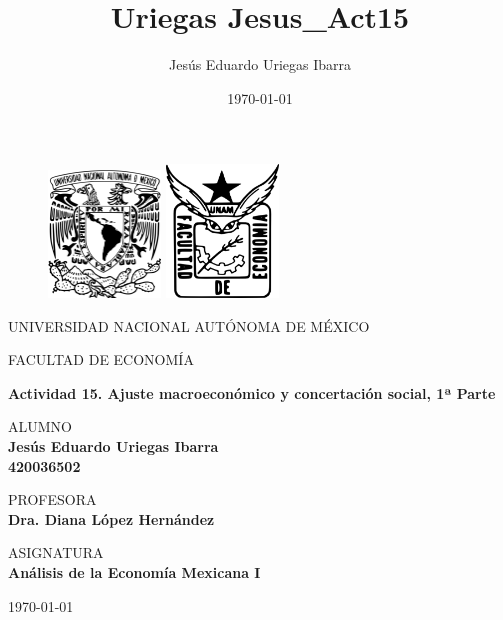 
\title{Uriegas Jesus_Act15}
\author{Jesús Eduardo Uriegas Ibarra}
\date{\today}

\begin{titlepage}

\thispagestyle{empty}
	
	\begin{figure}[ht]
			\includegraphics[width=3cm]{Images/Logo_UNAM.png}
			\label{EscudoUNAM}
	   \endminipage
			\includegraphics[width=3cm]{Images/logo_economia_unam.png}
			\label{EscudoEconomia}
		\endminipage
	\end{figure}
	
	\begin{center}
	\vspace{0.5cm}
	\LARGE
	UNIVERSIDAD NACIONAL AUTÓNOMA DE MÉXICO 
	
	\vspace{0.2cm}
	\LARGE
	FACULTAD DE ECONOMÍA
	
	\vspace{1cm}	
	\Large
	\textbf{Actividad 15. Ajuste macroeconómico y concertación social, 1ª Parte}

	\vspace{1cm}
	\normalsize	
	ALUMNO \\
	\vspace{.1cm}
	\large
	\textbf{Jesús Eduardo Uriegas Ibarra \\ 420036502}
	
	\vspace{1cm}
	\normalsize	
	PROFESORA \\
	\vspace{.1cm}
	\large
	\textbf{Dra. Diana López Hernández}
	
	\vspace{1cm}
	\normalsize	
	ASIGNATURA \\
	\vspace{.1cm}
	\large
	\textbf{Análisis de la Economía Mexicana I}
	
	\vspace{0.5cm}
	\today
	\end{center}
	
	\newpage
	
\end{titlepage}